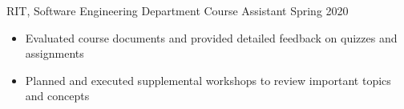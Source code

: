 \documentclass{awesome-cv}
\begin{document}
	\vspace{-0.1cm}
		\begin{cventries}
			\vspace{-0.1cm}
			
			\cventry
				{RIT, Software Engineering Department}
				{Course Assistant\small{\textnormal{\color{graytext}{, Introduction to Software Engineering}}}}
				{Spring 2020}
				{}
				{
					\vspace{-0.3cm}
					\begin{itemize}[nosep]
						\item Evaluated course documents and provided detailed feedback on quizzes and assignments
						\item Planned and executed supplemental workshops to review important topics and concepts
					\end{itemize}
					\vspace{-0.5cm}
				}
				
		\end{cventries}
	
\end{document}
